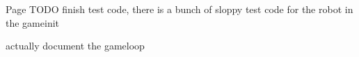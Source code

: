 \label{todo__todo000003}
\hypertarget{todo__todo000003}{}
 
\begin{DoxyDescription}
\item[Page \hyperlink{MainLoop}{} ]TODO finish test code, there is a bunch of sloppy test code for the robot in the gameinit 

actually document the gameloop 
\end{DoxyDescription}